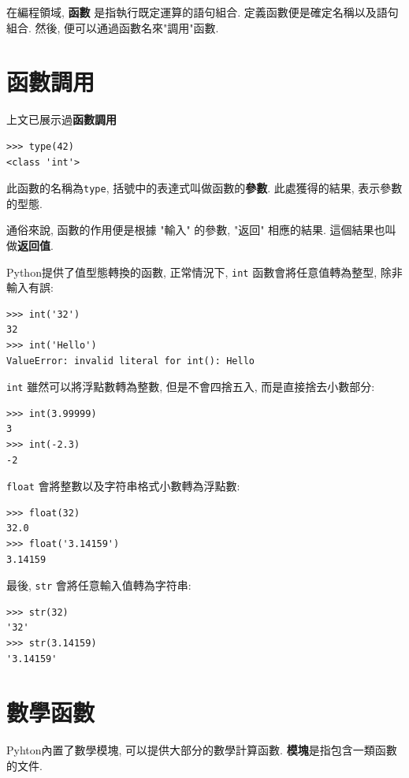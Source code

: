 \documentclass[10pt]{book}
\begin{document}
在編程領域, {\bf 函數} 是指執行既定運算的語句組合. 
定義函數便是確定名稱以及語句組合. 然後, 便可以通過函數名來"調用"函數. 

\section{函數調用}
\label{functionchap}

上文已展示過{\bf 函數調用}

\begin{verbatim}
>>> type(42)
<class 'int'>
\end{verbatim}
%
此函數的名稱為{\tt type},  括號中的表達式叫做函數的{\bf 參數}. 
此處獲得的結果, 表示參數的型態. 

通俗來說, 函數的作用便是根據 "輸入" 的參數, "返回" 相應的結果. 
這個結果也叫做{\bf 返回值}. 

Python提供了值型態轉換的函數, 正常情況下, {\tt int} 函數會將任意值轉為整型, 
除非輸入有誤:

\begin{verbatim}
>>> int('32')
32
>>> int('Hello')
ValueError: invalid literal for int(): Hello
\end{verbatim}
%
{\tt int} 雖然可以將浮點數轉為整數, 但是不會四捨五入, 而是直接捨去小數部分:

\begin{verbatim}
>>> int(3.99999)
3
>>> int(-2.3)
-2
\end{verbatim}
%
{\tt float} 會將整數以及字符串格式小數轉為浮點數:

\begin{verbatim}
>>> float(32)
32.0
>>> float('3.14159')
3.14159
\end{verbatim}
%
最後, {\tt str} 會將任意輸入值轉為字符串:

\begin{verbatim}
>>> str(32)
'32'
>>> str(3.14159)
'3.14159'
\end{verbatim}
%

\section{數學函數}

Pyhton內置了數學模塊, 可以提供大部分的數學計算函數. 
{\bf 模塊}是指包含一類函數的文件. 
\end{document}
